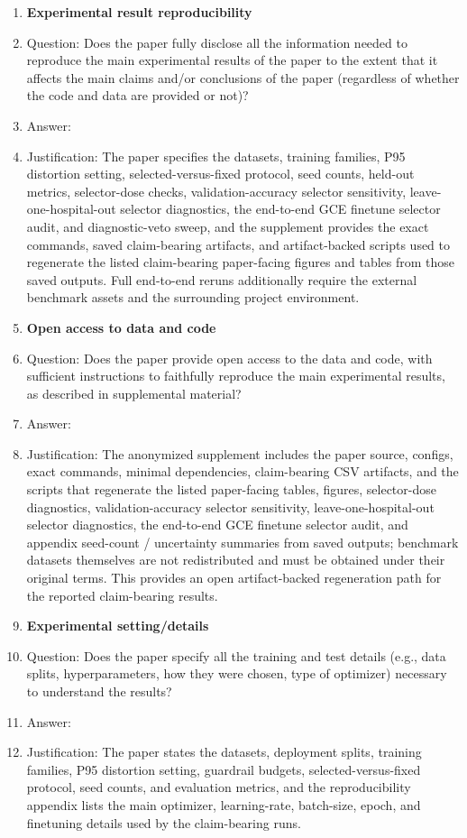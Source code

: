 \begin{enumerate}
\item {\bf Experimental result reproducibility}
  \item[] Question: Does the paper fully disclose all the information needed to reproduce the main experimental results of the paper to the extent that it affects the main claims and/or conclusions of the paper (regardless of whether the code and data are provided or not)?
  \item[] Answer: \answerYes{}
  \item[] Justification: The paper specifies the datasets, training families, P95 distortion setting, selected-versus-fixed protocol, seed counts, held-out metrics, selector-dose checks, validation-accuracy selector sensitivity, leave-one-hospital-out selector diagnostics, the end-to-end GCE finetune selector audit, and diagnostic-veto sweep, and the supplement provides the exact commands, saved claim-bearing artifacts, and artifact-backed scripts used to regenerate the listed claim-bearing paper-facing figures and tables from those saved outputs. Full end-to-end reruns additionally require the external benchmark assets and the surrounding project environment.

\item {\bf Open access to data and code}
  \item[] Question: Does the paper provide open access to the data and code, with sufficient instructions to faithfully reproduce the main experimental results, as described in supplemental material?
  \item[] Answer: \answerYes{}
  \item[] Justification: The anonymized supplement includes the paper source, configs, exact commands, minimal dependencies, claim-bearing CSV artifacts, and the scripts that regenerate the listed paper-facing tables, figures, selector-dose diagnostics, validation-accuracy selector sensitivity, leave-one-hospital-out selector diagnostics, the end-to-end GCE finetune selector audit, and appendix seed-count / uncertainty summaries from saved outputs; benchmark datasets themselves are not redistributed and must be obtained under their original terms. This provides an open artifact-backed regeneration path for the reported claim-bearing results.

\item {\bf Experimental setting/details}
  \item[] Question: Does the paper specify all the training and test details (e.g., data splits, hyperparameters, how they were chosen, type of optimizer) necessary to understand the results?
  \item[] Answer: \answerYes{}
  \item[] Justification: The paper states the datasets, deployment splits, training families, P95 distortion setting, guardrail budgets, selected-versus-fixed protocol, seed counts, and evaluation metrics, and the reproducibility appendix lists the main optimizer, learning-rate, batch-size, epoch, and finetuning details used by the claim-bearing runs.


\end{enumerate}
